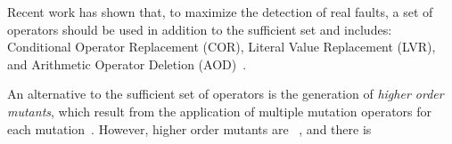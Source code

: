 Recent work has shown that, to maximize the detection of real faults, a set of operators should be used in addition to the sufficient set and includes: Conditional Operator Replacement (COR),
Literal Value Replacement (LVR), and Arithmetic Operator Deletion (AOD)~\cite{Kintis2018}. 

An alternative to the sufficient set of operators is the generation of \emph{higher order mutants}, which result from the application of multiple mutation operators for each mutation~\cite{jia2009higher,kintis2010evaluating,offutt1992investigations,papadakis2010empirical}. However, higher order mutants are ~\cite{papadakis2010mutation,papadakis2019mutation}, and there is 

%
%
%


%
%

